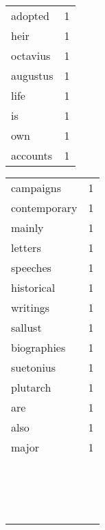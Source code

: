 \begin{center}
\begin{scriptsize}
\begin{tabular}{|ll|}
adopted       & 1\\%
heir          & 1\\%
octavius      & 1\\%
augustus      & 1\\%
life          & 1\\%
is            & 1\\%
own           & 1\\%
accounts      & 1\\%
\hline
\end{tabular}
\begin{tabular}{|ll|}
\hline
campaigns     & 1\\%
contemporary  & 1\\%
mainly        & 1\\%
letters       & 1\\%
speeches      & 1\\%
historical    & 1\\%
writings      & 1\\%
sallust       & 1\\%
biographies   & 1\\%
suetonius     & 1\\%
plutarch      & 1\\%
are           & 1\\%
also          & 1\\%
major         & 1\\%
&\\
&\\
&\\
&\\
&\\
&\\
&\\
&\\
&\\
&\\
&\\
&\\
&\\
&\\
&\\
&\\
\hline
\end{tabular}
\end{scriptsize}
\end{center}


\newpage
